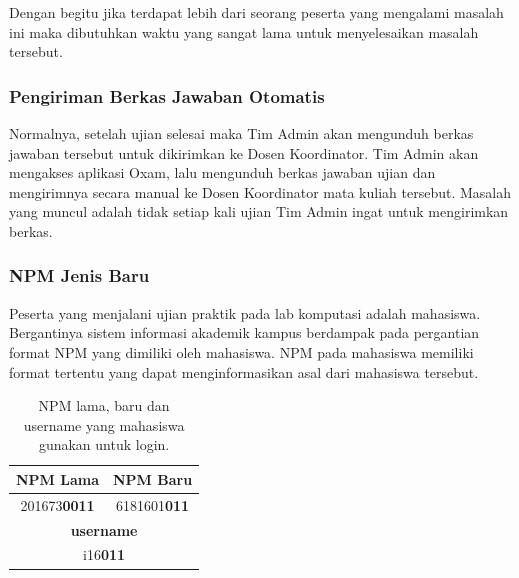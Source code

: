     Dengan begitu jika terdapat lebih dari seorang peserta yang mengalami
    masalah ini maka dibutuhkan waktu yang sangat lama untuk menyelesaikan
    masalah tersebut.

    \subsubsection{Pengiriman Berkas Jawaban
    Otomatis}\label{ref-prob-admin-pengiriman-berkas} 
    Normalnya, setelah ujian
    selesai maka Tim Admin akan mengunduh berkas jawaban tersebut untuk
    dikirimkan ke Dosen Koordinator. Tim Admin akan mengakses aplikasi Oxam,
    lalu mengunduh berkas jawaban ujian dan mengirimnya secara manual ke Dosen
    Koordinator mata kuliah tersebut. Masalah yang muncul adalah tidak setiap
    kali ujian Tim Admin ingat untuk mengirimkan berkas.
    
    \subsubsection{NPM Jenis Baru}\label{ref-prob-admin-npm-baru} 
    Peserta yang
    menjalani ujian praktik pada lab komputasi adalah mahasiswa. Bergantinya
    sistem informasi akademik kampus berdampak pada pergantian format NPM yang
    dimiliki oleh mahasiswa. NPM pada mahasiswa memiliki format tertentu yang
    dapat menginformasikan asal dari mahasiswa tersebut.

    \begin{table}[H]
        \centering
        \caption{NPM lama, baru dan username yang mahasiswa gunakan untuk login.}
        \label{tab:table-npm-detail}
        \def\arraystretch{2}
        \begin{tabular}{|c|c|}
            \hline
            \textbf{NPM Lama} & \textbf{NPM Baru} \\
            \hline
            201673\textbf{0011} & 6181601\textbf{011} \\
            \hline
            \multicolumn{2}{|c|}{\textbf{username}} \\
            \hline
            \multicolumn{2}{|c|}{i16\textbf{011}} \\
            \hline
        \end{tabular}
    \end{table}
    
